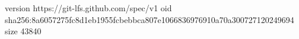 version https://git-lfs.github.com/spec/v1
oid sha256:8a6057275fc8d1eb1955fcbebbca807e1066836976910a70a300727120249694
size 43840
